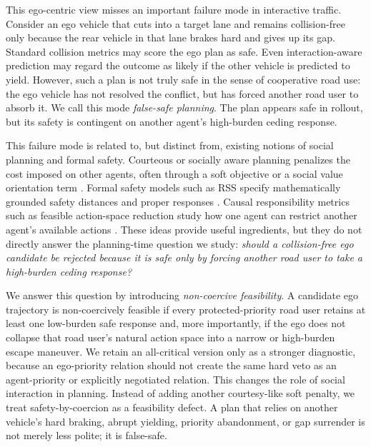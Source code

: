 \documentclass[10pt]{article}
\begin{document}
This ego-centric view misses an important failure mode in interactive traffic. Consider an ego vehicle that cuts into a target lane and remains collision-free only because the rear vehicle in that lane brakes hard and gives up its gap. Standard collision metrics may score the ego plan as safe. Even interaction-aware prediction may regard the outcome as likely if the other vehicle is predicted to yield. However, such a plan is not truly safe in the sense of cooperative road use: the ego vehicle has not resolved the conflict, but has forced another road user to absorb it. We call this mode \emph{false-safe planning}. The plan appears safe in rollout, but its safety is contingent on another agent's high-burden ceding response. 

This failure mode is related to, but distinct from, existing notions of social planning and formal safety. Courteous or socially aware planning penalizes the cost imposed on other agents, often through a soft objective or a social value orientation term \cite{sun2018courteous, schwarting2019social, crosato2022svo}. Formal safety models such as RSS specify mathematically grounded safety distances and proper responses \cite{shalev2017rss}. Causal responsibility metrics such as feasible action-space reduction study how one agent can restrict another agent's available actions \cite{george2023fear}. These ideas provide useful ingredients, but they do not directly answer the planning-time question we study: \emph{should a collision-free ego candidate be rejected because it is safe only by forcing another road user to take a high-burden ceding response?} 

We answer this question by introducing \emph{non-coercive feasibility}. A candidate ego trajectory is non-coercively feasible if every protected-priority road user retains at least one low-burden safe response and, more importantly, if the ego does not collapse that road user's natural action space into a narrow or high-burden escape maneuver. We retain an all-critical version only as a stronger diagnostic, because an ego-priority relation should not create the same hard veto as an agent-priority or explicitly negotiated relation. This changes the role of social interaction in planning. Instead of adding another courtesy-like soft penalty, we treat safety-by-coercion as a feasibility defect. A plan that relies on another vehicle's hard braking, abrupt yielding, priority abandonment, or gap surrender is not merely less polite; it is false-safe. 
\end{document}
